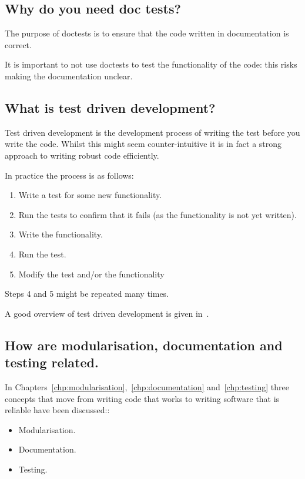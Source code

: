 \subsection{Why do you need doc tests?}

The purpose of doctests is to ensure that the code written in documentation is
correct.

It is important to not use doctests to test the functionality of the code: this
risks making the documentation unclear.


\subsection{What is test driven development?}

Test driven development is the development process of writing the test before
you write the code. Whilst this might seem counter-intuitive it is in fact a
strong approach to writing robust code efficiently.


In practice the process is as follows:
\begin{enumerate}

\item 

Write a test for some new functionality.

\item 

Run the tests to confirm that it fails (as the functionality is not yet
written).

\item 

Write the functionality.

\item 

Run the test.

\item 

Modify the test and/or the functionality

\end{enumerate}


Steps 4 and 5 might be repeated many times.


A good overview of test driven development is given in~\cite{percival2014test}.


\subsection{How are modularisation, documentation and testing related.}

In Chapters~\ref{chp:modularisation},~\ref{chp:documentation}
and~\ref{chp:testing}
three concepts that move from writing code that works to writing software
that is reliable have been discussed::
\begin{itemize}
\item 

Modularisation.

\item 

Documentation.

\item 

Testing.

\end{itemize}


